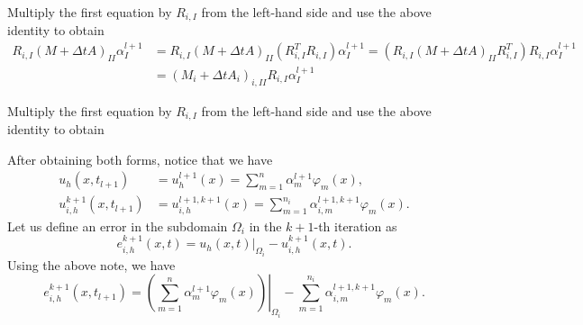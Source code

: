 \documentclass[a4paper, 11pt]{article}
\theoremstyle{plain}
\theoremstyle{definition}
\theoremstyle{remark}
\begin{document}
Multiply the first equation by $R_{i, I}$ from the left-hand side and use the above identity to obtain
\begin{align*}
    R_{i, I}\left(M + \Delta t A\right)_{II}\alpha_{I}^{l+1} &= R_{i, I}\left(M + \Delta t A\right)_{II}\left(R^{T}_{i, I}R_{i, I}\right)\alpha_{I}^{l+1} = \left(R_{i, I}\left(M + \Delta t A\right)_{II}R^{T}_{i, I}\right)R_{i, I}\alpha_{I}^{l+1}\\
    &= \left(M_{i} + \Delta t A_{i}\right)_{i, II}R_{i, I}\alpha_{I}^{l+1}
\end{align*}

Multiply the first equation by $R_{i, I}$ from the left-hand side and use the above identity to obtain

After obtaining both forms, notice that we have
\begin{align*}
    u_{h}(x, t_{l + 1}) &= u_{h}^{l+1}(x) = \sum_{m=1}^{n}\alpha^{l+1}_{m}\varphi_{m}(x),\\
    u^{k + 1}_{i, h}(x, t_{l + 1}) &= u_{i, h}^{l+1, k + 1}(x) = \sum_{m = 1}^{n_{i}}\alpha^{l+1, k + 1}_{i, m}\varphi_{m}(x).
\end{align*}
Let us define an error in the subdomain $\Omega_{i}$ in the $k+1$-th iteration as
\begin{equation*}
    e_{i, h}^{k+1}(x, t) = \left.u_{h}(x, t)\right|_{\Omega_{i}} - u^{k + 1}_{i, h}(x, t).
\end{equation*}
Using the above note, we have
\begin{equation*}
    e_{i, h}^{k+1}(x, t_{l+1}) = \left.\left(\sum_{m=1}^{n}\alpha^{l+1}_{m}\varphi_{m}(x)\right)\right|_{\Omega_{i}} - \sum_{m = 1}^{n_{i}}\alpha^{l+1, k + 1}_{i, m}\varphi_{m}(x).
\end{equation*}
\end{document}
